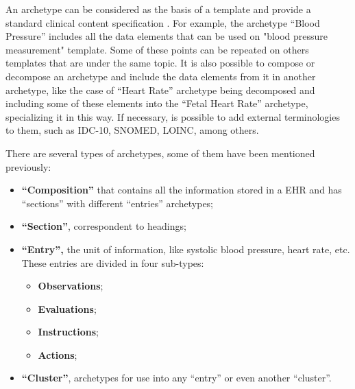 \documentclass[mim_thesis.tex]{subfiles}
\begin{document}
An archetype can be considered as the basis of a template and provide a standard clinical content specification \citep{Madsen2010}. For example, the archetype “Blood Pressure” includes all the data elements that can be used on "blood pressure measurement" template. Some of these points can be repeated on others templates that are under the same topic. It is also possible to compose or decompose an archetype and include the data elements from it in another archetype, like the case of “Heart Rate” archetype being decomposed and including some of these elements into the “Fetal Heart Rate” archetype, specializing it in this way. If necessary, is possible to add external terminologies to them, such as IDC-10, SNOMED, LOINC, among others.
% 
% 

There are several types of archetypes, some of them have been mentioned previously: 
\begin{itemize}[noitemsep]
\item \textbf{“Composition”} that contains all the information stored in a EHR and has “sections” with different “entries” archetypes; 
\item \textbf{“Section”}, correspondent to headings;
\item \textbf{“Entry”,} the unit of information, like systolic blood pressure, heart rate, etc. These entries are divided in four sub-types:
\begin{itemize}[noitemsep]
\item \textbf{Observations}; 
\item \textbf{Evaluations}; 
\item \textbf{Instructions}; 
\item \textbf{Actions};
\end{itemize}
\item \textbf{“Cluster”}, archetypes for use into any “entry” or even another “cluster”.
\end{itemize}
\end{document}

